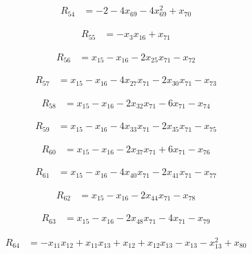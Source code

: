 \begin{align*}
R_{54} &= -2 -4 x_{69} -4 x_{69}^{2} +x_{70}
\end{align*}

\begin{align*}
R_{55} &= -x_{3} x_{16} +x_{71}
\end{align*}

\begin{align*}
R_{56} &= x_{15} -x_{16} -2 x_{25} x_{71} -x_{72}
\end{align*}

\begin{align*}
R_{57} &= x_{15} -x_{16} -4 x_{27} x_{71} -2 x_{30} x_{71} -x_{73}
\end{align*}

\begin{align*}
R_{58} &= x_{15} -x_{16} -2 x_{32} x_{71} -6 x_{71} -x_{74}
\end{align*}

\begin{align*}
R_{59} &= x_{15} -x_{16} -4 x_{33} x_{71} -2 x_{35} x_{71} -x_{75}
\end{align*}

\begin{align*}
R_{60} &= x_{15} -x_{16} -2 x_{37} x_{71} +6 x_{71} -x_{76}
\end{align*}

\begin{align*}
R_{61} &= x_{15} -x_{16} -4 x_{40} x_{71} -2 x_{41} x_{71} -x_{77}
\end{align*}

\begin{align*}
R_{62} &= x_{15} -x_{16} -2 x_{44} x_{71} -x_{78}
\end{align*}

\begin{align*}
R_{63} &= x_{15} -x_{16} -2 x_{48} x_{71} -4 x_{71} -x_{79}
\end{align*}

\begin{align*}
R_{64} &= -x_{11} x_{12} +x_{11} x_{13} +x_{12} +x_{12} x_{13} -x_{13} -x_{13}^{2} +x_{80}
\end{align*}

